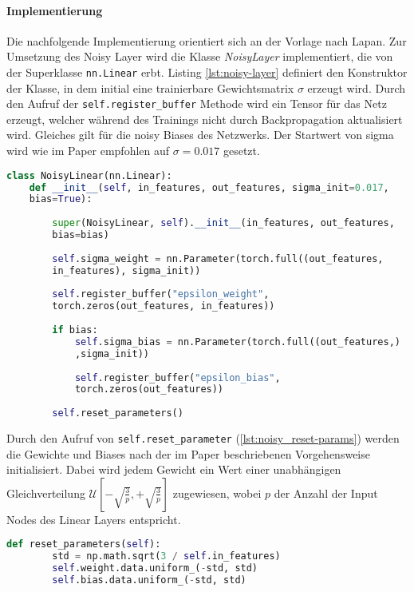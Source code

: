 \documentclass[11pt]{scrartcl}
\begin{document}
\paragraph*{Implementierung}
\noindent
\newline
Die nachfolgende Implementierung orientiert sich an der Vorlage nach Lapan\cite[~S.179]{L2018}.
Zur Umsetzung des Noisy Layer wird die Klasse \textit{NoisyLayer} implementiert, die von der
Superklasse \lstinline!nn.Linear! erbt. Listing \ref{lst:noisy-layer} definiert den Konstruktor
der Klasse, in dem initial eine trainierbare Gewichtsmatrix $\sigma$ erzeugt wird. Durch den
Aufruf der \lstinline!self.register_buffer! Methode wird ein Tensor für das Netz erzeugt, welcher
während des Trainings nicht durch Backpropagation aktualisiert wird. Gleiches gilt für die noisy
Biases des Netzwerks. Der Startwert von sigma wird wie im Paper empfohlen \cite[~S.6]{FAPMOGM2017}
auf $\sigma=0.017$ gesetzt.

\begin{lstlisting}[language=Python, caption=Konstruktor Noisy Layer, label=lst:noisy-layer]
class NoisyLinear(nn.Linear):
	def __init__(self, in_features, out_features, sigma_init=0.017, 
	bias=True):
		
		super(NoisyLinear, self).__init__(in_features, out_features,
		bias=bias)
		
		self.sigma_weight = nn.Parameter(torch.full((out_features,
		in_features), sigma_init))
		
		self.register_buffer("epsilon_weight", 
		torch.zeros(out_features, in_features))
		
		if bias:
    		self.sigma_bias = nn.Parameter(torch.full((out_features,)
    		,sigma_init))
    		
    		self.register_buffer("epsilon_bias", 
    		torch.zeros(out_features))
    		
		self.reset_parameters()
\end{lstlisting}

Durch den Aufruf von \lstinline!self.reset_parameter! (\ref{lst:noisy_reset-params}) werden die
Gewichte und Biases nach der im Paper beschriebenen Vorgehensweise initialisiert. Dabei wird
jedem Gewicht ein Wert einer unabhängigen Gleichverteilung
$\mathcal{U}[-\sqrt{\frac{3}{p}},+\sqrt{\frac{3}{p}}]$ zugewiesen, wobei $p$ der Anzahl der
Input Nodes des Linear Layers entspricht.
\newpage
 
\begin{lstlisting}[language=Python, caption=Reinitialisierung der Gewichte und Biases, 
label=lst:noisy_reset-params]
	def reset_parameters(self):
		std = np.math.sqrt(3 / self.in_features)
		self.weight.data.uniform_(-std, std)
		self.bias.data.uniform_(-std, std)
\end{lstlisting}
\end{document}
